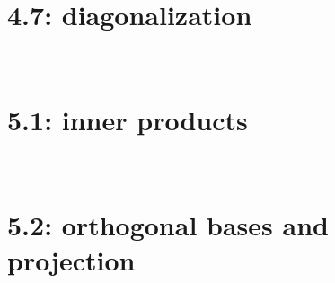 \documentclass[11pt]{amsart}
\theoremstyle{definition}
\theoremstyle{named}
\numberwithin{myalgctr}{section}
\begin{document}
\section*{4.7: diagonalization} 



\setcounter{exercises@solutionnumber}{1}
\ \\
\section*{5.1: inner products}\label{S:innerproduct}


\setcounter{exercises@solutionnumber}{1}
\ \\
\section*{5.2: orthogonal bases and projection}\label{S:orthogonal}

%
%
%
%
%
%
%
%
\end{document}
